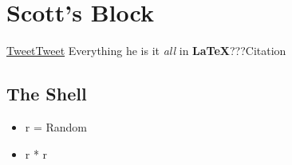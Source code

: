 \section{Scott's Block}


\href{http://www.twitter.com}{TweetTweet} 
Everything he is it \textit{all} in \textbf{LaTeX}???Citation\cite{Ferry_2006}


\subsection{The Shell}
\begin{itemize}
\item r = Random
\item r * r
\end{itemize}